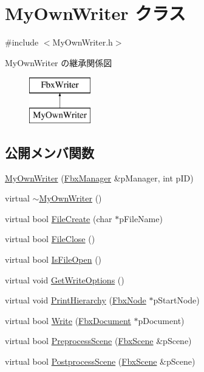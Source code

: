 \hypertarget{class_my_own_writer}{}\section{My\+Own\+Writer クラス}
\label{class_my_own_writer}


{\ttfamily \#include $<$My\+Own\+Writer.\+h$>$}

My\+Own\+Writer の継承関係図\begin{figure}[H]
\begin{center}
\leavevmode
\includegraphics[height=2.000000cm]{class_my_own_writer}
\end{center}
\end{figure}
\subsection*{公開メンバ関数}
\begin{DoxyCompactItemize}
\item 
\hyperlink{class_my_own_writer_adc6230f5f42e586d4c7ac744c858ebee}{My\+Own\+Writer} (\hyperlink{class_fbx_manager}{Fbx\+Manager} \&p\+Manager, int p\+ID)
\item 
virtual \hyperlink{class_my_own_writer_a5cfb2292b192574f3ed783ce5ce306a9}{$\sim$\+My\+Own\+Writer} ()
\item 
virtual bool \hyperlink{class_my_own_writer_aa30bedb6fc76d76b2199143b208161b1}{File\+Create} (char $\ast$p\+File\+Name)
\item 
virtual bool \hyperlink{class_my_own_writer_a9f834f1899e95c41291188819241df4b}{File\+Close} ()
\item 
virtual bool \hyperlink{class_my_own_writer_a09f75dc6a30ecdb00927253a7f69eae8}{Is\+File\+Open} ()
\item 
virtual void \hyperlink{class_my_own_writer_a2e3d99525964397118372f3f685e9dde}{Get\+Write\+Options} ()
\item 
virtual void \hyperlink{class_my_own_writer_aca6af34bd7fb17cfc4ed5e87453c3960}{Print\+Hierarchy} (\hyperlink{class_fbx_node}{Fbx\+Node} $\ast$p\+Start\+Node)
\item 
virtual bool \hyperlink{class_my_own_writer_a7ec7a323efec7306c17198a469667d1e}{Write} (\hyperlink{class_fbx_document}{Fbx\+Document} $\ast$p\+Document)
\item 
virtual bool \hyperlink{class_my_own_writer_abd6b665986bf496ed56cc07ca1f30a21}{Preprocess\+Scene} (\hyperlink{class_fbx_scene}{Fbx\+Scene} \&p\+Scene)
\item 
virtual bool \hyperlink{class_my_own_writer_ae115fe8a21568ef1cd2a465a15d79e80}{Postprocess\+Scene} (\hyperlink{class_fbx_scene}{Fbx\+Scene} \&p\+Scene)
\end{DoxyCompactItemize}
